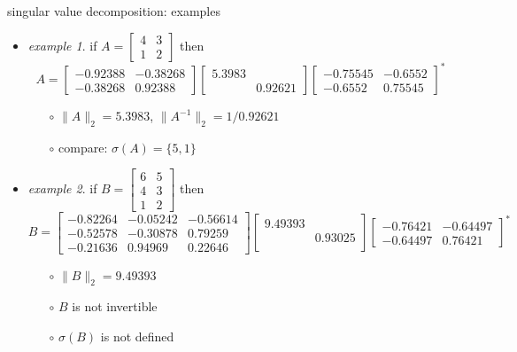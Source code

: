 \documentclass[10pt,hyperref]{beamer}
\newcommand{\ds}{\displaystyle}
\begin{document}
\begin{frame}{singular value decomposition: examples}

\begin{itemize}
\small
\item \emph{example 1}. if $\ds A = \begin{bmatrix} 4 & 3 \\ 1 & 2 \end{bmatrix}$ then
    $$A =
\begin{bmatrix}    -0.92388  &  -0.38268 \\  -0.38268   &  0.92388 \end{bmatrix}
\begin{bmatrix}      5.3983  &      \\   &  0.92621  \end{bmatrix}
\begin{bmatrix}    -0.75545  & -0.6552 \\  -0.6552 & 0.75545 \end{bmatrix}^*$$
    \begin{itemize}
    \item[$\circ$] $\|A\|_2 = 5.3983$, $\|A^{-1}\|_2 = 1/0.92621$
    \item[$\circ$] compare: $\sigma(A) = \{5,1\}$
    \end{itemize}

\bigskip
\item \emph{example 2}. if $\ds B = \begin{bmatrix} 6 & 5 \\ 4 & 3 \\ 1 & 2 \end{bmatrix}$ then
\footnotesize
    $$B =
\begin{bmatrix} -0.82264 & -0.05242 & -0.56614 \\
                -0.52578 & -0.30878 & 0.79259 \\
                -0.21636 & 0.94969 & 0.22646 \end{bmatrix}
\begin{bmatrix} 9.49393  & \\ & 0.93025 \\ & \end{bmatrix}
\begin{bmatrix} -0.76421 & -0.64497 \\ -0.64497 & 0.76421 \end{bmatrix}^*$$
\small
    \begin{itemize}
    \item[$\circ$] $\|B\|_2 = 9.49393$
    \item[$\circ$] $B$ is not invertible
    \item[$\circ$] $\sigma(B)$ is not defined
    \end{itemize}

\end{itemize}
\end{frame}
\end{document}
